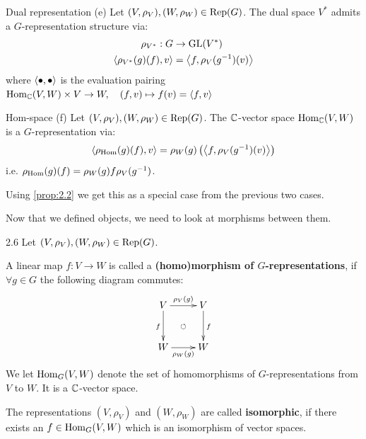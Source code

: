 \documentclass[twoside = false,	%
		headsepline,		%
		parskip = true,
		]{scrbook}						%
\begin{document}
    \begin{definition*}
    {Dual representation (e)}
        Let $(V,\rho_V), (W,\rho_W) \in \mathrm{Rep}(G)$. The dual space $V^*$ admits a $G$-representation structure via:
        \begin{equation*}
        \begin{split}
            \rho_{V^*}: G &\to\mathrm{GL}(V^*) \\
                \left\langle \rho_{V^*}(g)(f),v\right\rangle &= \left\langle f,\rho_V(g^{-1})(v)\right\rangle
        \end{split}
        \end{equation*}
        where $\left\langle \bullet,\bullet\right\rangle$ is the evaluation pairing $\mathrm{Hom}_\mathbb C(V,W) \times V \to W, \quad (f,v) \mapsto f(v) = \left\langle f,v\right\rangle$
    \end{definition*}
    
    \begin{definition*}
    {Hom-space (f)}
        Let $(V,\rho_V), (W,\rho_W) \in \mathrm{Rep}(G)$. The $\mathbb C$-vector space $\mathrm{Hom}_\mathbb C(V,W)$ is a $G$-representation via:
        \begin{equation*}
        \begin{split}
            \left\langle \rho_{\mathrm{Hom}}(g)(f),v\right\rangle = \rho_W(g)\left( \left\langle f,\rho_V(g^{-1})(v)\right\rangle\right)
        \end{split}
        \end{equation*}
        i.e. $\rho_{\mathrm{Hom}}(g)(f) = \rho_W(g) f \rho_V(g^{-1})$.
    \end{definition*}
    \begin{remark*}{}
        Using \ref{prop:2.2} we get this as a special case from the previous two cases.
    \end{remark*}
    
    Now that we defined objects, we need to look at morphisms between them.
    
    \begin{definition}{}{2.6}
        Let $(V,\rho_V), (W,\rho_W) \in \mathrm{Rep}(G)$.
        
        A linear map $f: V \to W$ is called a \textbf{(homo)morphism of $G$-representations}, if $\forall g \in G$ the following diagram commutes:
        \begin{equation*}
        \xymatrix @R=30pt{
            V \ar^{\rho_V(g)}[r] \ar_{f}[d] & V\ar^{f}[d] \\
            W \ar_{\rho_W(g)}[r] & W\ar@{}|{\circlearrowleft}[ul]
        }
        \end{equation*}
        We let $\mathrm{Hom}_G(V,W)$ denote the set of homomorphisms of $G$-representations from $V$ to $W$. It is a $\mathbb C$-vector space.
        
        The representations $(V,\rho_V)$ and $(W,\rho_W)$ are called \textbf{isomorphic}, if there exists an $f \in \mathrm{Hom}_G(V,W)$ which is an isomorphism of vector spaces.
    \end{definition}
    
\end{document}
